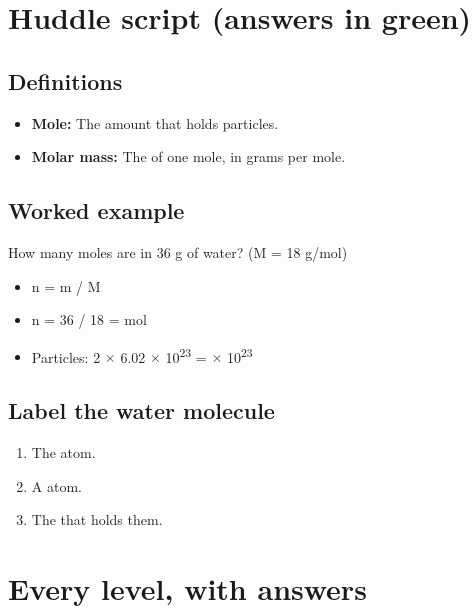 \documentclass[11pt]{article}
\begin{document}
\section*{Huddle script (answers in green)}
\subsection*{Definitions}\begin{itemize}
\item \textbf{Mole:} The amount that holds  particles.
\item \textbf{Molar mass:} The  of one mole, in grams per mole.
\end{itemize}
\subsection*{Worked example}
How many moles are in 36 g of water? (M = 18 g/mol)\\
\begin{itemize}
\item n = m / M
\item n = 36 / 18 =  mol
\item Particles: 2 $\times$ 6.02 $\times$ 10\textsuperscript{2}\textsuperscript{3} =  $\times$ 10\textsuperscript{2}\textsuperscript{3}
\end{itemize}
\subsection*{Label the water molecule}
\begin{enumerate}
\item The  atom.
\item A  atom.
\item The  that holds them.
\end{enumerate}
\section*{Every level, with answers}
\end{document}
